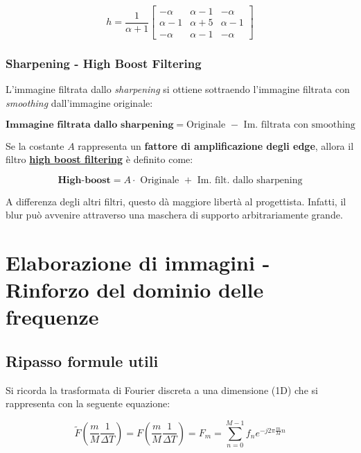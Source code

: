 \documentclass[a4paper]{article}
\begin{document}
	\begin{equation*}
		h = \dfrac{1}{\alpha + 1} \begin{bmatrix}
			-\alpha  & \alpha-1 & -\alpha  \\
			\alpha-1 & \alpha+5 & \alpha-1 \\
			-\alpha	 & \alpha-1 & -\alpha
		\end{bmatrix}
	\end{equation*}
	
	\subsubsection{Sharpening - High Boost Filtering}
	
	L'immagine filtrata dallo \emph{sharpening} si ottiene sottraendo l'immagine filtrata con \emph{smoothing} dall'immagine originale:
	
	\begin{equation*}
		\textbf{Immagine filtrata dallo sharpening} = \text{Originale } - \text{ Im. filtrata con smoothing}
	\end{equation*}

	\noindent
	Se la costante $A$ rappresenta un \textbf{fattore di amplificazione degli edge}, allora il filtro \textcolor{Red3}{\textbf{\underline{high boost filtering}}} è definito come:
	
	\begin{equation*}
		\textbf{High-boost} = A \cdot \text{ Originale } + \text{ Im. filt. dallo sharpening}
	\end{equation*}

	\noindent
	A differenza degli altri filtri, questo dà maggiore libertà al progettista. Infatti, il blur può avvenire attraverso una maschera di supporto arbitrariamente grande.
	
	\newpage
	
	\section{Elaborazione di immagini - Rinforzo del dominio delle frequenze}
	
	\subsection{Ripasso formule utili}
	
	Si ricorda la trasformata di Fourier discreta a una dimensione (1D) che si rappresenta con la seguente equazione:
	
	\begin{equation*}
		\tilde{F}\left(\dfrac{m}{M} \dfrac{1}{\Delta T}\right) = F\left(\dfrac{m}{M} \dfrac{1}{\Delta T}\right) = F_{m} = \sum_{n=0}^{M-1} f_{n} e^{-j 2 \pi \frac{m}{M} n}
	\end{equation*}
\end{document}
